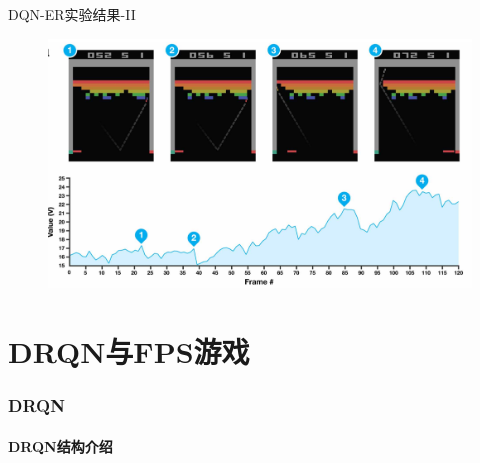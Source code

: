 \documentclass[10pt]{beamer}
\begin{document}
	\begin{frame}{DQN-ER}{实验结果-II}
		\begin{figure}
			\centering
			\includegraphics[width=0.9\linewidth]{pictures/drqn-expr-result-chart}
		\end{figure}
		
	\end{frame}
	
	\part{DRQN与FPS游戏}\label{part:fps}
	
	\section{DRQN}
	
	\subsection{DRQN结构介绍}
	
\end{document}
